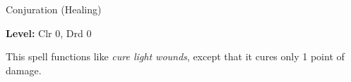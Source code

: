 
Conjuration (Healing)

\textbf{Level:} Clr 0, Drd 0

This spell functions like \textit{cure light wounds}, except that it cures only 
1 point of damage.

